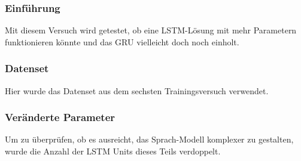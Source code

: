 \documentclass[pdftex,a4paper,halfparskip, article]{scrartcl}
\begin{document}

\subsubsection*{Einführung}

Mit diesem Versuch wird getestet, ob eine LSTM-Lösung mit mehr Parametern funktionieren könnte und das GRU vielleicht doch noch einholt. 

\subsubsection*{Datenset}

Hier wurde das Datenset aus dem sechsten Trainingsversuch verwendet.

\subsubsection*{Veränderte Parameter}

Um zu überprüfen, ob es ausreicht, das Sprach-Modell komplexer zu gestalten, wurde die Anzahl der LSTM Units dieses Teils verdoppelt. 
\end{document}
